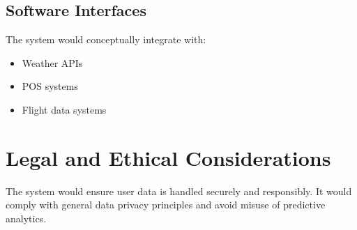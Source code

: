 \documentclass[12pt]{report}
\begin{document}
\subsection{Software Interfaces}
The system would conceptually integrate with:
\begin{itemize}
    \item Weather APIs
    \item POS systems
    \item Flight data systems
\end{itemize}

\section{Legal and Ethical Considerations}
The system would ensure user data is handled securely and responsibly. It would comply with general data privacy principles and avoid misuse of predictive analytics.
\end{document}
